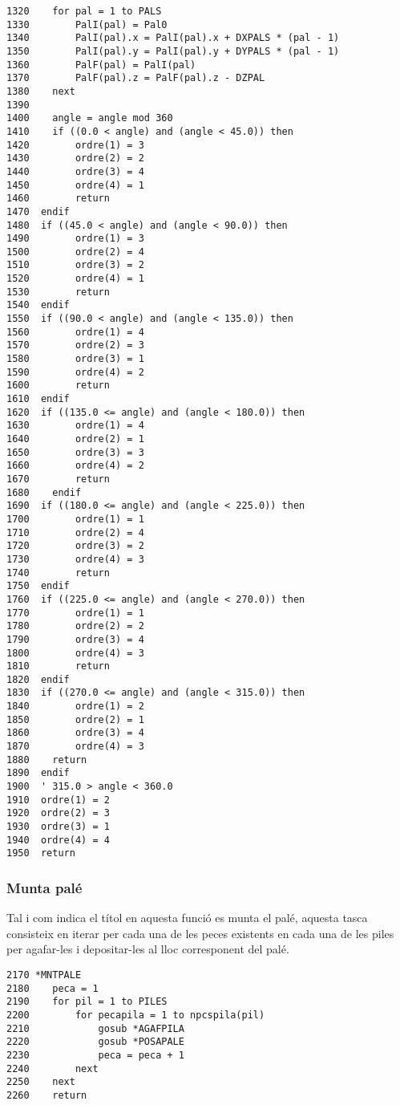 \begin{verbatim}
1320    for pal = 1 to PALS
1330        PalI(pal) = Pal0
1340        PalI(pal).x = PalI(pal).x + DXPALS * (pal - 1)
1350        PalI(pal).y = PalI(pal).y + DYPALS * (pal - 1)
1360        PalF(pal) = PalI(pal)
1370        PalF(pal).z = PalF(pal).z - DZPAL
1380    next
1390 	
1400    angle = angle mod 360
1410 	if ((0.0 < angle) and (angle < 45.0)) then
1420        ordre(1) = 3
1430        ordre(2) = 2
1440        ordre(3) = 4
1450        ordre(4) = 1
1460        return
1470  endif
1480  if ((45.0 < angle) and (angle < 90.0)) then 
1490        ordre(1) = 3
1500        ordre(2) = 4
1510        ordre(3) = 2
1520        ordre(4) = 1
1530        return
1540  endif
1550  if ((90.0 < angle) and (angle < 135.0)) then
1560        ordre(1) = 4
1570        ordre(2) = 3
1580        ordre(3) = 1
1590        ordre(4) = 2
1600        return
1610  endif
1620  if ((135.0 <= angle) and (angle < 180.0)) then
1630        ordre(1) = 4
1640        ordre(2) = 1
1650        ordre(3) = 3
1660        ordre(4) = 2
1670 		return
1680 	endif
1690  if ((180.0 <= angle) and (angle < 225.0)) then 
1700        ordre(1) = 1
1710        ordre(2) = 4
1720        ordre(3) = 2
1730        ordre(4) = 3
1740        return
1750  endif
1760  if ((225.0 <= angle) and (angle < 270.0)) then
1770        ordre(1) = 1
1780        ordre(2) = 2
1790        ordre(3) = 4
1800        ordre(4) = 3
1810        return
1820  endif
1830  if ((270.0 <= angle) and (angle < 315.0)) then 
1840        ordre(1) = 2
1850        ordre(2) = 1
1860        ordre(3) = 4
1870        ordre(4) = 3
1880 	return
1890  endif
1900  ' 315.0 > angle < 360.0
1910  ordre(1) = 2
1920  ordre(2) = 3
1930  ordre(3) = 1
1940  ordre(4) = 4
1950  return
\end{verbatim}

\subsubsection{Munta palé}
Tal i com indica el títol en aquesta funció es munta el palé, aquesta tasca
consisteix en iterar per cada una de les peces existents en cada una de les
piles per agafar-les i depositar-les al lloc corresponent del palé.

\begin{verbatim}
2170 *MNTPALE
2180    peca = 1
2190    for pil = 1 to PILES 
2200        for pecapila = 1 to npcspila(pil)
2210            gosub *AGAFPILA
2220            gosub *POSAPALE
2230            peca = peca + 1
2240        next
2250    next
2260    return
\end{verbatim}


